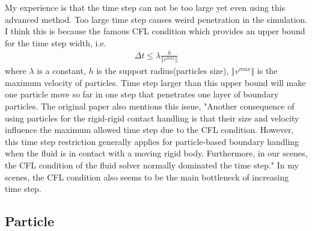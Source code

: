 \documentclass[acmlarge]{acmart}
\begin{document}
My experience is that the time step can not be too large yet even using this advanced method.
Too large time step causes weird penetration in the simulation. I think this is because the famous CFL condition\cite{Lewy1928}
which provides an upper bound for the time step width, i.e.
\begin{align*}
  \Delta t \leq \lambda \frac{h}{\Vert v^{max}\Vert}
\end{align*}
where $\lambda$ is a constant, $h$ is the support radius(particles size), $\Vert v^{max}\Vert$ is the maximum velocity of particles.
Time step larger than this upper bound will make one particle move so far in one step that penetrates one layer of boundary particles.
The original paper also mentions this issue, "Another consequence of using
particles for the rigid-rigid contact handling is that their size and
velocity influence the maximum allowed time step due to the CFL
condition. However, this time step restriction generally applies for
particle-based boundary handling when the fluid is in contact with
a moving rigid body. Furthermore, in our scenes, the CFL condition
of the fluid solver normally dominated the time step." In my scenes, the CFL condition also seems to be the 
main bottleneck of increasing time step.

\subsection{Particle}
\end{document}
